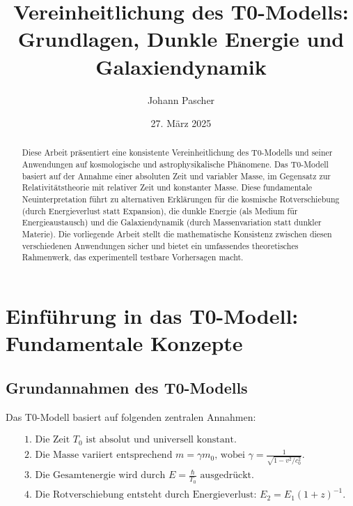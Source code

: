\documentclass[a4paper,12pt]{article}
\theoremstyle{definition}
\theoremstyle{remark}
\begin{document}
	
	\title{Vereinheitlichung des T0-Modells: \\Grundlagen, Dunkle Energie und Galaxiendynamik}
	\author{Johann Pascher}
	\date{27. März 2025}
	\maketitle
	
	\begin{abstract}
		Diese Arbeit präsentiert eine konsistente Vereinheitlichung des T0-Modells und seiner Anwendungen auf kosmologische und astrophysikalische Phänomene. Das T0-Modell basiert auf der Annahme einer absoluten Zeit und variabler Masse, im Gegensatz zur Relativitätstheorie mit relativer Zeit und konstanter Masse. Diese fundamentale Neuinterpretation führt zu alternativen Erklärungen für die kosmische Rotverschiebung (durch Energieverlust statt Expansion), die dunkle Energie (als Medium für Energieaustausch) und die Galaxiendynamik (durch Massenvariation statt dunkler Materie). Die vorliegende Arbeit stellt die mathematische Konsistenz zwischen diesen verschiedenen Anwendungen sicher und bietet ein umfassendes theoretisches Rahmenwerk, das experimentell testbare Vorhersagen macht.
	\end{abstract}
	
	\tableofcontents
	\newpage
	
	\section{Einführung in das T0-Modell: Fundamentale Konzepte}
	
	\subsection{Grundannahmen des T0-Modells}
	
	Das T0-Modell basiert auf folgenden zentralen Annahmen:
	
	\begin{tcolorbox}[colback=blue!5!white,colframe=blue!75!black,title=Grundannahmen des T0-Modells]
		\begin{align}
			&\text{1. Die Zeit $T_0$ ist absolut und universell konstant.} \\
			&\text{2. Die Masse variiert entsprechend $m = \gamma m_0$, wobei $\gamma = \frac{1}{\sqrt{1-v^2/c_0^2}}$.} \\
			&\text{3. Die Gesamtenergie wird durch $E = \frac{\hbar}{T_0}$ ausgedrückt.} \\
			&\text{4. Die Rotverschiebung entsteht durch Energieverlust: $E_2 = E_1(1+z)^{-1}$.}
		\end{align}
	\end{tcolorbox}
	
\end{document}
